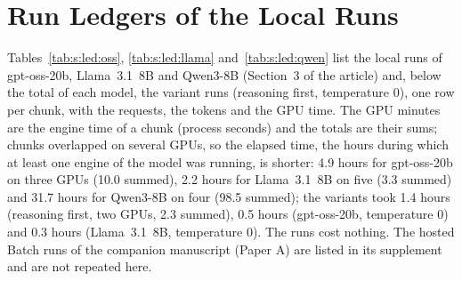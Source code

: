 \section{Run Ledgers of the Local Runs}
\label{sup:ledger}

Tables~\ref{tab:s:led:oss}, \ref{tab:s:led:llama} and~\ref{tab:s:led:qwen} list the local runs of gpt-oss-20b, Llama~3.1~8B and Qwen3-8B (Section~3 of the article) and, below the total of each model, the variant runs (reasoning first, temperature 0), one row per chunk, with the requests, the tokens and the GPU time. The GPU minutes are the engine time of a chunk (process seconds) and the totals are their sums; chunks overlapped on several GPUs, so the elapsed time, the hours during which at least one engine of the model was running, is shorter: 4.9 hours for gpt-oss-20b on three GPUs (10.0 summed), 2.2 hours for Llama~3.1~8B on five (3.3 summed) and 31.7 hours for Qwen3-8B on four (98.5 summed); the variants took 1.4 hours (reasoning first, two GPUs, 2.3 summed), 0.5 hours (gpt-oss-20b, temperature 0) and 0.3 hours (Llama~3.1~8B, temperature 0). The runs cost nothing. The hosted Batch runs of the companion manuscript (Paper A) are listed in its supplement and are not repeated here.


